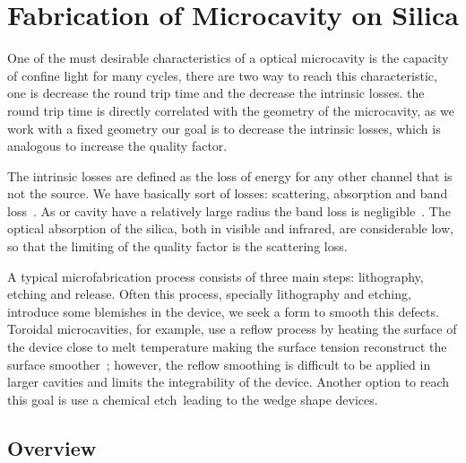 \chapter{Fabrication of Microcavity on Silica}
\label{chap:fabrication}
One of the must desirable characteristics of a optical microcavity is the capacity of confine light for many cycles, there are two way to reach this characteristic, one is decrease the round trip time and the decrease the intrinsic losses. the round trip time is directly correlated with the geometry of the microcavity, as we work with a fixed geometry our goal is to decrease the intrinsic losses, which is analogous to increase the quality factor. 

The intrinsic losses are defined as the loss of energy for any other channel that is not the source. We have basically sort of losses: scattering, absorption and band loss~\needcit. As or cavity have a relatively large radius the band loss is negligible~\needcit. The optical absorption of the silica, both in visible and infrared, are considerable low, so that the limiting of the quality factor is the scattering loss. 

A typical microfabrication process consists of three main steps: lithography, etching and release. Often this process, specially lithography and etching, introduce some blemishes in the device, we seek a form to smooth this defects.
Toroidal microcavities, for example, use a reflow process by heating the surface of the device close to melt temperature making the surface tension reconstruct the surface smoother~\needcit; however, the reflow smoothing is difficult to be applied in larger cavities and limits the integrability of the device. Another option to reach this goal is use a chemical etch~\needcit leading to the wedge shape devices. 


\section{Overview}

